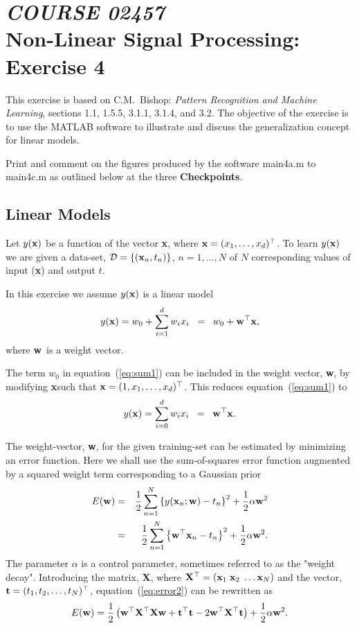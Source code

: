 \documentclass[times,12pt]{article}    %
\def\x{{\bf x}}
\def\X{{\bf X}}
\def\w{{\bf w}}
\def\t{{\bf t}}
\def\D{\mathcal{D}}
\begin{document}
\section*{{\it COURSE 02457}\\[5mm] Non-Linear Signal Processing: Exercise 4}

This exercise is based on C.M.\ Bishop: {\it Pattern Recognition
and Machine Learning}, sections 1.1, 1.5.5, 3.1.1, 3.1.4, and 3.2.
The objective of the exercise is to use the MATLAB software to
illustrate and discuss the generalization concept for linear models.

Print and comment on the figures produced by the software {\sf
 main4a.m} to {\sf main4c.m} as outlined below at the three {\bf
 Checkpoints}.


\subsection*{Linear Models}
Let $y(\x)$ be a function of the vector \x, where
$\x=(x_1,\ldots,x_d)^\top$. To learn $y(\x)$  we are given a data-set, $\D = \left\{ (\x_n,t_n) \right\}$, $
n=1,\ldots,N$ of $N$ corresponding values of input (\x) and output $t$.

In this exercise we assume $y(\x)$ is a linear model
\begin{equation}
  \label{eq:sum1}
  y(\x) = w_0 + \sum_{i=1}^d w_i x_i \;\; = \;\; w_0 + \w^\top \x,
\end{equation}
where \w\ is a weight vector.

The term $w_0$ in equation~(\ref{eq:sum1}) can be included in the
weight vector, \w, by modifying \x such that
$\x=(1,x_1,\ldots,x_d)^\top$. This reduces equation~(\ref{eq:sum1}) to
\begin{equation}
  \label{eq:sum2}
  y(\x) = \sum_{i=0}^d w_i x_i \;\; = \;\; \w^\top \x.
\end{equation}

The weight-vector, \w, for the given training-set
can be estimated by minimizing an error function. Here we shall use the
sum-of-squares error function augmented by a squared weight term corresponding to a Gaussian prior
\begin{eqnarray}
  \label{eq:error1}
  E(\w) &=& \frac{1}{2} \sum_{n=1}^N \left\{ y(\x_n;\w)-t_n \right\}^2 + \frac{1}{2}\alpha\w^2 \\
  \label{eq:error2}
       &=&  \frac{1}{2} \sum_{n=1}^N \left\{ \w^\top\x_n -t_n  \right\}^2 + \frac{1}{2}\alpha\w^2.
\end{eqnarray}
The parameter $\alpha$ is a control parameter, sometimes referred to as the "weight decay".
Introducing the matrix, \X, where $\X^\top=(\x_1\; \x_2\; \ldots
\x_N)$ and the vector, $\t = (t_1, t_2,\ldots, t_N)^\top$,
equation~(\ref{eq:error2}) can be rewritten as
\begin{equation}
  \label{eq:error3}
  E(\w) = \frac{1}{2} \left( \w^\top \X^\top \X \w + \t^\top \t -
  2\w^\top \X^\top \t  \right) + \frac{1}{2}\alpha\w^2.
\end{equation}
\end{document}
